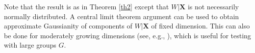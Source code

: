 \documentclass[aos,MSNbibl,dvips]{arximspdf}
\def\cal{\mathcal}
\newcommand{\EE}{\mathbb{E}}
\newcommand{\bx}{\mathbf{X}}
\begin{document}
Note that the result is as in Theorem \ref{th2} except that $W \vert
\bx
$ is not necessarily normally
distributed. A
central limit theorem argument can be used to obtain approximate
Gaussianity of components of $W|\bx$ of fixed dimension.
This can also be done for moderately growing dimensions
(see, e.g., \cite{portnoy1987central}), which is useful for testing
with large groups $G$.

%
%
%
%
\end{document}
